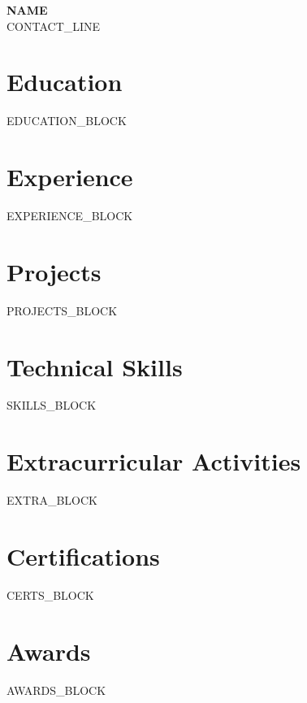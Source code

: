 \documentclass[letterpaper,11pt]{article}
\newcommand{\resumeSubHeadingListStart}{\begin{itemize}[leftmargin=0.15in, label={}]}
\newcommand{\resumeSubHeadingListEnd}{\end{itemize}}
\begin{document}
\begin{center}
    \textbf{\Huge \scshape {{NAME}}} \\ \vspace{1pt}
    \small {{CONTACT_LINE}}
\end{center}

\section{Education}
  \resumeSubHeadingListStart
  {{EDUCATION_BLOCK}}
  \resumeSubHeadingListEnd

\section{Experience}
  \resumeSubHeadingListStart
  {{EXPERIENCE_BLOCK}}
  \resumeSubHeadingListEnd

\section{Projects}
  \resumeSubHeadingListStart
  {{PROJECTS_BLOCK}}
  \resumeSubHeadingListEnd

\section{Technical Skills}
  {{SKILLS_BLOCK}}

\section{Extracurricular Activities}
  \resumeSubHeadingListStart
  {{EXTRA_BLOCK}}
  \resumeSubHeadingListEnd

\section{Certifications}
  {{CERTS_BLOCK}}

\section{Awards}
  {{AWARDS_BLOCK}}
\end{document}
